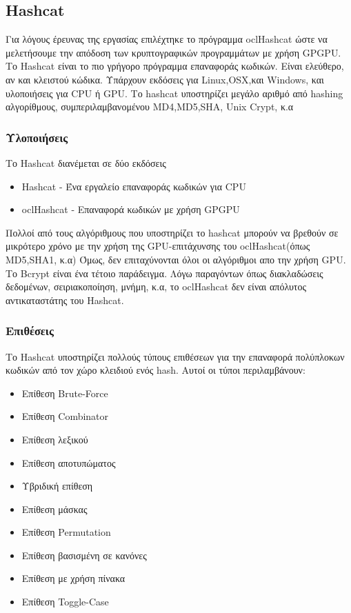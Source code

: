 \subsection{Hashcat}
Για λόγους έρευνας της εργασίας επιλέχτηκε το πρόγραμμα oclHashcat ώστε να μελετήσουμε την απόδοση των κρυπτογραφικών προγραμμάτων με χρήση GPGPU. Το Hashcat είναι το πιο γρήγορο πρόγραμμα επαναφοράς κωδικών. Είναι ελεύθερο, αν και κλειστού κώδικα. Υπάρχουν εκδόσεις για Linux,OSX,και Windows, και υλοποιήσεις για CPU ή GPU. Το hashcat υποστηρίζει μεγάλο αριθμό από hashing αλγορίθμους, συμπεριλαμβανομένου MD4,MD5,SHA, Unix Crypt, κ.α
\subsubsection{Υλοποιήσεις}
Το Hashcat διανέμεται σε δύο εκδόσεις
\begin{itemize}
\item Hashcat - Ένα εργαλείο επαναφοράς κωδικών για CPU
\item oclHashcat - Επαναφορά κωδικών με χρήση GPGPU
\end{itemize}

Πολλοί από τους αλγόριθμους που υποστηρίζει το hashcat μπορούν να βρεθούν σε μικρότερο χρόνο με την χρήση της GPU-επιτάχυνσης του oclHashcat(όπως MD5,SHA1, κ.α) Όμως, δεν επιταχύνονται όλοι οι αλγόριθμοι απο την χρήση GPU. Το Bcrypt είναι ένα τέτοιο παράδειγμα. Λόγω παραγόντων όπως διακλαδώσεις δεδομένων, σειριακοποίηση, μνήμη, κ.α, το oclHashcat δεν είναι απόλυτος αντικαταστάτης του Hashcat.

\subsubsection{Επιθέσεις}
Το Hashcat υποστηρίζει πολλούς τύπους επιθέσεων για την επαναφορά πολύπλοκων κωδικών από τον χώρο κλειδιού ενός hash. Αυτοί οι τύποι περιλαμβάνουν:
\begin{itemize}
\item Επίθεση Brute-Force
\item Επίθεση Combinator
\item Επίθεση λεξικού
\item Επίθεση αποτυπώματος
\item Υβριδική επίθεση
\item Επίθεση μάσκας
\item Επίθεση Permutation
\item Επίθεση βασισμένη σε κανόνες
\item Επίθεση με χρήση πίνακα
\item Επίθεση Toggle-Case
\end{itemize}


